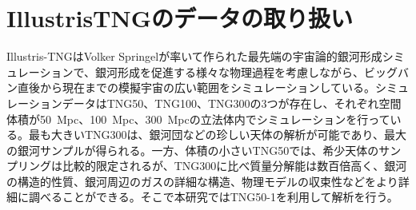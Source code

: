 \section{IllustrisTNGのデータの取り扱い}
%
%
%
%
%
%
%

Illustris-TNGはVolker Springelが率いて作られた最先端の宇宙論的銀河形成シミュレーションで、銀河形成を促進する様々な物理過程を考慮しながら、ビッグバン直後から現在までの模擬宇宙の広い範囲をシミュレーションしている。シミュレーションデータはTNG50、TNG100、TNG300の3つが存在し、それぞれ空間体積が\SI{50}{Mpc}、\SI{100}{Mpc}、\SI{300}{Mpc}の立法体内でシミュレーションを行っている。最も大きいTNG300は、銀河団などの珍しい天体の解析が可能であり、最大の銀河サンプルが得られる。一方、体積の小さいTNG50では、希少天体のサンプリングは比較的限定されるが、TNG300に比べ質量分解能は数百倍高く、銀河の構造的性質、銀河周辺のガスの詳細な構造、物理モデルの収束性などをより詳細に調べることができる。そこで本研究ではTNG50-1を利用して解析を行う。

